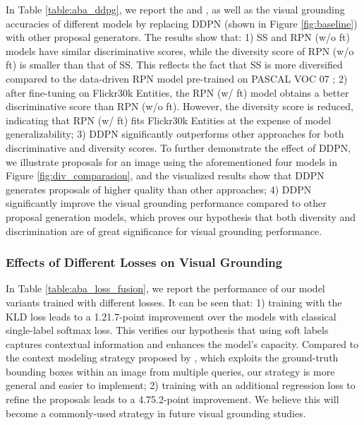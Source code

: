 \documentclass{article}
\begin{document}
In Table \ref{table:aba_ddpg}, we report the  and , as well as the visual grounding accuracies of different models by replacing DDPN (shown in Figure \ref{fig:baseline}) with other proposal generators. The results show that: 1) SS and RPN (w/o ft) models have similar discriminative scores, while the diversity score of RPN (w/o ft) is smaller than that of SS. This reflects the fact that SS is more diversified compared to the data-driven RPN model pre-trained on PASCAL VOC 07 \cite{everingham2010pascal}; 2) after fine-tuning on Flickr30k Entities, the RPN (w/ ft) model obtains a better discriminative score than RPN (w/o ft). However, the diversity score is reduced, indicating that RPN (w/ ft) fits Flickr30k Entities at the expense of model generalizability; 3) DDPN significantly outperforms other approaches for both discriminative and diversity scores. To further demonstrate the effect of DDPN, we illustrate proposals for an image using the aforementioned four models in Figure \ref{fig:div_comparasion}, and the visualized results show that DDPN generates proposals of higher quality than other approaches; 4) DDPN significantly improve the visual grounding performance compared to other proposal generation models, which proves our hypothesis that both diversity and discrimination are of great significance for visual grounding performance.

\subsubsection{Effects of Different Losses on Visual Grounding}
In Table \ref{table:aba_loss_fusion}, we report the performance of our model variants trained with different losses. It can be seen that: 1) training with the KLD loss leads to a 1.21.7-point improvement over the models with classical single-label softmax loss. This verifies our hypothesis that using soft labels captures contextual information and enhances the model's capacity. Compared to the context modeling strategy proposed by \cite{chen2017query}, which exploits the ground-truth bounding boxes within an image from multiple queries, our strategy is more general and easier to implement; 2) training with an additional regression loss to refine the proposals leads to a 4.75.2-point improvement.
We believe this will become a commonly-used strategy in future visual grounding studies.
\end{document}
